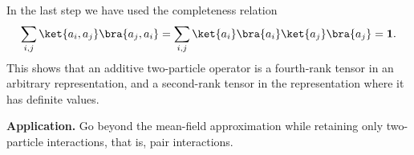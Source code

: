 In the last step we have used the completeness relation
\[\sum_{i,j}\ket{a_i,a_j}\bra{a_j,a_i}
=\sum_{i,j}\ket{a_i}\bra{a_i}\ket{a_j}\bra{a_j}=\mathbf1.\]
This shows that an additive two-particle operator is a fourth-rank tensor in an arbitrary representation, and a second-rank tensor in the representation where it has definite values.

\textbf{Application.} Go beyond the mean-field approximation while retaining only two-particle interactions, that is, pair interactions.